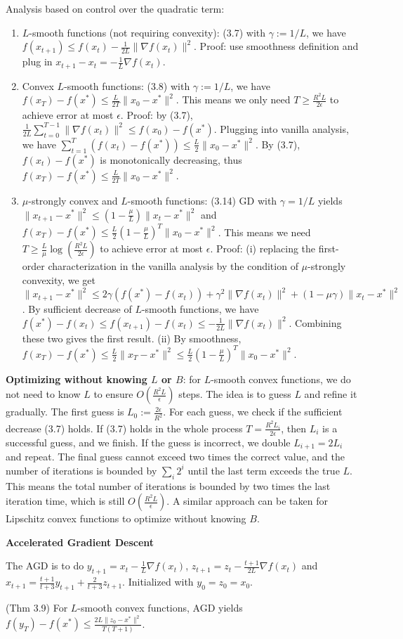 Analysis based on control over the quadratic term:
\begin{enumerate}
    \item $L$-smooth functions (not requiring convexity): (3.7) with $\gamma:=1/L$, we have $f(x_{t+1}) \le f(x_t) - \frac{1}{2L}\|\nabla f(x_t)\|^2$. Proof: use smoothness definition and plug in $x_{t+1}-x_t = -\frac{1}{L}\nabla f(x_t)$.
    \item Convex $L$-smooth functions: (3.8) with $\gamma:=1/L$, we have $f(x_T) - f(x^*) \le \frac{L}{2T}\|x_0 - x^*\|^2$. This means we only need $T \ge \frac{R^2 L}{2\epsilon}$ to achieve error at most $\epsilon$. Proof: by (3.7), $\frac{1}{2L}\sum_{t=0}^{T-1} \|\nabla f(x_t)\|^2 \le f(x_0) - f(x^*)$. Plugging into vanilla analysis, we have $\sum_{t=1}^T (f(x_t) - f(x^*)) \le \frac{L}{2}\|x_0 - x^*\|^2$. By (3.7), $f(x_t) - f(x^*)$ is monotonically decreasing, thus $f(x_T) - f(x^*) \le \frac{L}{2T}\|x_0 - x^*\|^2$. 
    \item $\mu$-strongly convex and $L$-smooth functions: (3.14) GD with $\gamma = 1/L$ yields $\|x_{t+1}-x^*\|^2 \le (1-\frac{\mu}{L})\|x_t - x^*\|^2$ and $f(x_T) - f(x^*) \le \frac{L}{2}(1-\frac{\mu}{L})^T \|x_0 -x^*\|^2$. This means we need $T \ge \frac{L}{\mu}\log\left(\frac{R^2 L}{2\epsilon}\right)$ to achieve error at most $\epsilon$. Proof: (i) replacing the first-order characterization in the vanilla analysis by the condition of $\mu$-strongly convexity, we get $\|x_{t+1}-x^*\|^2 \le 2\gamma \left(f(x^*) - f(x_t)\right) + \gamma^2 \|\nabla f(x_t)\|^2 + (1-\mu\gamma)\|x_t - x^*\|^2$. By sufficient decrease of $L$-smooth functions, we have $f(x^*) - f(x_t) \le f(x_{t+1}) - f(x_t) \le -\frac{1}{2L}\|\nabla f(x_t)\|^2$. Combining these two gives the first result. (ii) By smoothness, $f(x_T) - f(x^*) \le \frac{L}{2}\|x_T - x^*\|^2 \le \frac{L}{2}(1-\frac{\mu}{L})^T \|x_0 -x^*\|^2$. 
\end{enumerate}

\textbf{Optimizing without knowing $L$ or $B$}: for $L$-smooth convex functions, we do not need to know $L$ to ensure $O(\frac{R^2 L}{\epsilon})$ steps. The idea is to guess $L$ and refine it gradually. The first guess is $L_0 := \frac{2\epsilon}{R^2}$. For each guess, we check if the sufficient decrease (3.7) holds. If (3.7) holds in the whole process $T = \frac{R^2 L_i}{2\epsilon}$, then $L_i$ is a successful guess, and we finish. If the guess is incorrect, we double $L_{i+1} = 2L_i$ and repeat. The final guess cannot exceed two times the correct value, and the number of iterations is bounded by $\sum_i 2^i$ until the last term exceeds the true $L$. This means the total number of iterations is bounded by two times the last iteration time, which is still $O(\frac{R^2 L}{\epsilon})$. A similar approach can be taken for Lipschitz convex functions to optimize without knowing $B$.

\textbf{Accelerated Gradient Descent}

The AGD is to do $y_{t+1}= x_t - \frac{1}{L}\nabla f(x_t)$, $z_{t+1} = z_t - \frac{t+1}{2L}\nabla f(x_t)$ and $x_{t+1} = \frac{t+1}{t+3} y_{t+1} + \frac{2}{t+3}z_{t+1}$. Initialized with $y_0=z_0 = x_0$.

(Thm 3.9) For $L$-smooth convex functions, AGD yields $f(y_T) - f(x^*) \le \frac{2L\|z_0 - x^*\|^2}{T(T+1)}$.